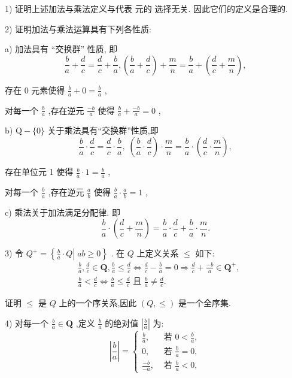 1) 证明上述加法与乘法定义与代表 元的 选择无关. 因此它们的定义是合理的.

2) 证明加法与乘法运算具有下列各性质:

a) 加法具有 “交换群” 性质, 即
$$\frac{b}{a} + \frac{d}{c} = \frac{d}{c} + \frac{b}{a},\left( {\frac{b}{a} + \frac{d}{c}}\right)  + \frac{m}{n} = \frac{b}{a} + \left( {\frac{d}{c} + \frac{m}{n}}\right) ,$$

存在 0 元素使得 $\frac{b}{a} + 0 = \frac{b}{a}$ ,

对每一个 $\frac{b}{a}$ ,存在逆元 $\frac{-b}{a}$ 使得 $\frac{b}{a} + \frac{-b}{a} = 0$ ,

b) $\mathrm{Q} - \{ 0\}$ 关于乘法具有“交换群”性质,即
$$\frac{b}{a} \cdot  \frac{d}{c} = \frac{d}{c} \cdot  \frac{b}{a},\;\left( {\frac{b}{a} \cdot  \frac{d}{c}}\right)  \cdot  \frac{m}{n} = \frac{b}{a} \cdot  \left( {\frac{d}{c} \cdot  \frac{m}{n}}\right) ,$$

存在单位元 1 使得 $\frac{b}{a} \cdot  1 = \frac{b}{a}$ ,

对每一个 $\frac{b}{a}$ ,存在逆元 $\frac{a}{b}$ 使得 $\frac{b}{a} \cdot  \frac{a}{b} = 1$ ,

c) 乘法关于加法满足分配律. 即
$$\frac{b}{a} \cdot  \left( {\frac{d}{c} + \frac{m}{n}}\right)  = \frac{b}{a} \cdot  \frac{d}{c} + \frac{b}{a} \cdot  \frac{m}{n}.$$

3) 令 ${Q}^{ + } = \left\{  {\left. {\frac{b}{a} \cdot  Q}\right| \;{ab} \geq  0}\right\}$ . 在 $Q$ 上定义关系 $\leq$ 如下:
\begin{align*}
	&\frac{b}{a},\frac{d}{c} \in  \mathbf{Q},\frac{b}{a} \leq  \frac{d}{c} \Leftrightarrow  \frac{d}{c} - \frac{b}{a} = 0 \Rightarrow  \frac{d}{c} + \frac{-b}{a} \in  {\mathbf{Q}}^{ + },\\
	&\frac{b}{a} < \frac{d}{c} \Leftrightarrow  \frac{b}{a} \leq  \frac{d}{c}\text{ 且 }\frac{b}{a} \neq  \frac{d}{c}.
\end{align*}

证明 $\leq$ 是 $Q$ 上的一个序关系,因此 $\left( {Q, \leq  }\right)$ 是一个全序集.

4) 对每一个 $\frac{b}{a} \in  \mathbf{Q}$ ,定义 $\frac{b}{a}$ 的绝对值 $\left| \frac{b}{a}\right|$ 为:
$$\left| \frac{b}{a}\right|  = \left\{  \begin{array}{ll} \frac{b}{a}, & \text{ 若 }0 < \frac{b}{a}, \\  0, & \text{ 若 }\frac{b}{a} = 0, \\  \frac{-b}{-a}, & \text{ 若 }\frac{b}{a} < 0, \end{array}\right.$$

